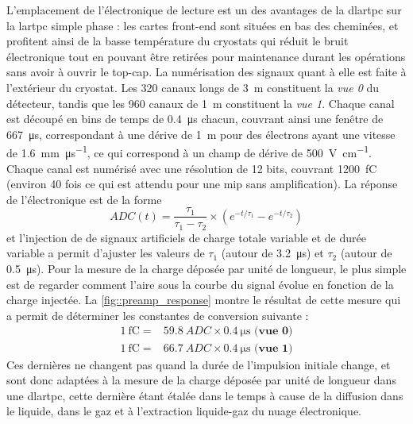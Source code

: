       L'emplacement de l'électronique de lecture est un des avantages de la \gls{dlartpc} sur la \gls{lartpc} simple phase : les cartes front-end sont situées en bas des cheminées, et profitent ainsi de la basse température du cryostats qui réduit le bruit électronique tout en pouvant être retirées pour maintenance durant les opérations sans avoir à ouvrir le top-cap. La numérisation des signaux quant à elle est faite à l'extérieur du cryostat. Les 320 canaux longs de \SI{3}{\meter} constituent la \textit{vue 0} du détecteur, tandis que les 960 canaux de \SI{1}{\meter} constituent la \textit{vue 1}. Chaque canal est découpé en  bins de temps de \SI{0.4}{\micro\second} chacun, couvrant ainsi une fenêtre de \SI{667}{\micro\second}, correspondant à une dérive de \SI{1}{\meter} pour des électrons ayant une vitesse de \SI{1.6}{\milli\meter\per\micro\second}, ce qui correspond à un champ de dérive de \SI{500}{\volt\per\centi\meter}. Chaque canal est numérisé avec une résolution de 12 bits, couvrant \SI{1200}{\femto\coulomb} (environ 40 fois ce qui est attendu pour une \gls{mip} sans amplification). La réponse de l'électronique est de la forme
      \begin{equation}\label{eq::preamp_response}
        ADC(t) = \frac{\tau_1}{\tau_1-\tau_2}\times\left(e^{-t/\tau_1} - e^{-t/\tau_2} \right)
      \end{equation}
      et l'injection de de signaux artificiels de charge totale variable et de durée variable a permit d'ajuster les valeurs de $\tau_1$ (autour de \SI{3.2}{\micro\second}) et $\tau_2$ (autour de \SI{0.5}{\micro\second}). Pour la mesure de la charge déposée par unité de longueur, le plus simple est de regarder comment l'aire sous la courbe du signal évolue en fonction de la charge injectée. La \autoref{fig::preamp_response} montre le résultat de cette mesure qui a permit de déterminer les constantes de conversion suivante : 
      \begin{eqnarray}\label{eq::adc2charge}
        \SI{1}{\femto\coulomb} = & \SI{59.8}{ADC}\times\SI{0.4}{\micro\second}\textbf{ (vue 0)}\\
        \SI{1}{\femto\coulomb} = & \SI{66.7}{ADC}\times\SI{0.4}{\micro\second}\textbf{ (vue 1)}
      \end{eqnarray}
      Ces dernières ne changent pas quand la durée de l'impulsion initiale change, et sont donc adaptées à la mesure de la charge déposée par unité de longueur dans une \gls{dlartpc}, cette dernière étant étalée dans le temps à cause de la diffusion dans le liquide, dans le gaz et à l'extraction liquide-gaz du nuage électronique.

